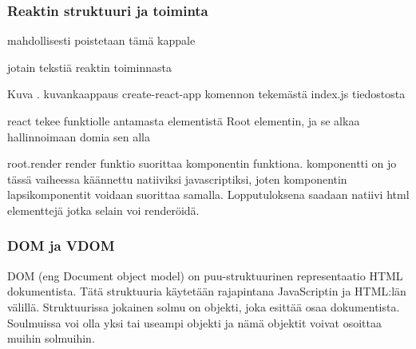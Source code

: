\subsubsection{Reaktin struktuuri ja toiminta}
mahdollisesti poistetaan  tämä kappale





jotain tekstiä reaktin toiminnasta 
\bigskip



Kuva \getImgCount{}. kuvankaappaus create-react-app komennon tekemästä index.js tiedostosta
\medskip

react tekee funktiolle antamasta elementistä Root elementin, ja se alkaa hallinnoimaan domia sen alla
\medskip


root.render
render funktio suorittaa komponentin funktiona. komponentti on jo tässä vaiheessa käännettu natiiviksi javascriptiksi, 
joten komponentin lapsikomponentit voidaan suorittaa samalla. Lopputuloksena saadaan natiivi html elementtejä jotka selain voi renderöidä.

\medskip



\subsubsection{DOM ja VDOM}





DOM (eng Document object model) on puu-struktuurinen representaatio HTML dokumentista.
Tätä struktuuria käytetään rajapintana JavaScriptin ja HTML:län välillä. 
Struktuurissa jokainen solmu on objekti, joka esittää osaa dokumentista. 
Soulmuissa voi olla yksi tai useampi objekti ja nämä objektit voivat osoittaa muihin solmuihin.



